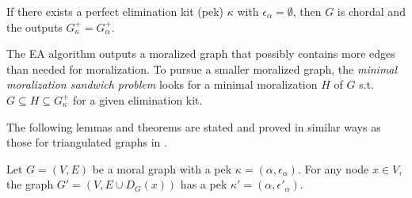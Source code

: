 If there exists a perfect elimination kit (pek) $\kappa$ with $\epsilon_{\alpha} =\emptyset$, then $G$ is chordal and the outputs $G_{\kappa}^+=G_{\alpha}^+$. 

The EA algorithm outputs a moralized graph that possibly contains more edges than needed for moralization. To pursue a smaller moralized graph, the \textit{minimal moralization sandwich problem} looks for a minimal moralization $H$ of $G$ s.t. $G \subseteq H \subseteq G_{\kappa}^+$ for a given elimination kit. 

The following lemmas and theorems are stated and proved in similar ways as those for triangulated graphs in \cite{rose1976algorithmic}. 

\begin{lemma}
\label{lm:rose_lm1}
Let $G=(V,E)$ be a moral graph with a pek $\kappa=(\alpha,\epsilon_{\alpha})$. For any node $x \in V$, the graph $G'=(V,E\cup D_G(x))$ has a pek $\kappa'=(\alpha, \epsilon'_{\alpha})$. 
\end{lemma}  
